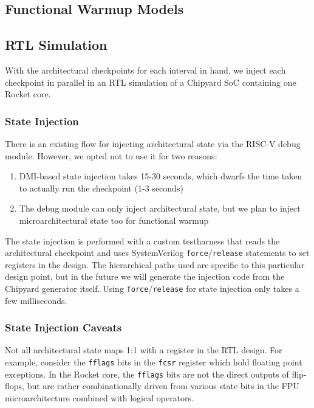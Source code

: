\documentclass[sigplan,nonacm,10pt]{acmart}
\begin{document}
\subsection{Functional Warmup Models}

\subsection{RTL Simulation}

With the architectural checkpoints for each interval in hand, we inject each checkpoint in parallel in an RTL simulation of a Chipyard SoC containing one Rocket core.

\subsubsection{State Injection}

There is an existing flow for injecting architectural state via the RISC-V debug module.
However, we opted not to use it for two reasons:
\begin{enumerate}
  \item DMI-based state injection takes 15-30 seconds, which dwarfs the time taken to actually run the checkpoint (1-3 seconds)
  \item The debug module can only inject architectural state, but we plan to inject microarchitectural state too for functional warmup
\end{enumerate}

The state injection is performed with a custom testharness that reads the architectural checkpoint and uses SystemVerilog \texttt{force}/\texttt{release} statements to set registers in the design.
The hierarchical paths used are specific to this particular design point, but in the future we will generate the injection code from the Chipyard generator itself.
Using \texttt{force}/\texttt{release} for state injection only takes a few milliseconds.

\subsubsection{State Injection Caveats}

Not all architectural state maps 1:1 with a register in the RTL design.
For example, consider the \texttt{fflags} bits in the \texttt{fcsr} register which hold floating point exceptions.
In the Rocket core, the \texttt{fflags} bits are not the direct outputs of flip-flops, but are rather combinationally driven from various state bits in the FPU microarchitecture combined with logical operators.
\end{document}
